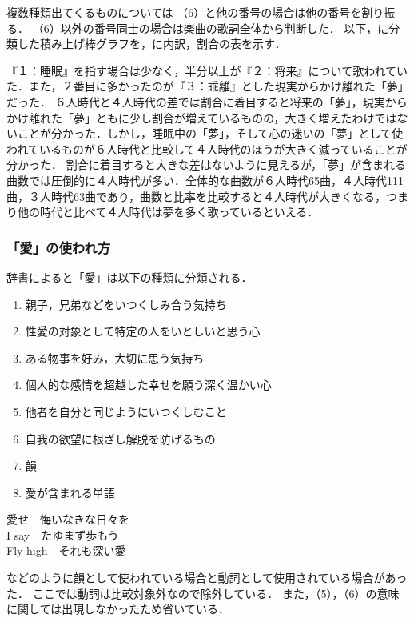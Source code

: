 複数種類出てくるものについては
（6）と他の番号の場合は他の番号を割り振る．
（6）以外の番号同士の場合は楽曲の歌詞全体から判断した．
%
以下，に分類した積み上げ棒グラフを，\protect{}に内訳，割合の表を示す．



『１：睡眠』を指す場合は少なく，半分以上が『２：将来』について歌われていた．また，２番目に多かったのが『３：乖離』とした現実からかけ離れた「夢」だった．
６人時代と４人時代の差では割合に着目すると将来の「夢」，現実からかけ離れた「夢」ともに少し割合が増えているものの，大きく増えたわけではないことが分かった．しかし，睡眠中の「夢」，そして心の迷いの「夢」として使われているものが６人時代と比較して４人時代のほうが大きく減っていることが分かった．
割合に着目すると大きな差はないように見えるが，「夢」が含まれる曲数では圧倒的に４人時代が多い．全体的な曲数が６人時代65曲，４人時代111曲，３人時代63曲であり，曲数と比率を比較すると４人時代が大きくなる，つまり他の時代と比べて４人時代は夢を多く歌っているといえる．



\subsubsection{「愛」の使われ方}
辞書によると「愛」は以下の種類に分類される\cite{AI}．
\begin{enumerate}
	\item 親子，兄弟などをいつくしみ合う気持ち
	\item 性愛の対象として特定の人をいとしいと思う心
	\item ある物事を好み，大切に思う気持ち
	\item 個人的な感情を超越した幸せを願う深く温かい心
	\item 他者を自分と同じようにいつくしむこと
	\item 自我の欲望に根ざし解脱を防げるもの
	\item 韻
	\item 愛が含まれる単語
\end{enumerate}

\begin{musequote}
	愛せ　悔いなきな日々を\\
	I say　たゆまず歩もう\\
	Fly high　それも深い愛
\end{musequote}
などのように韻として使われている場合と動詞として使用されている場合があった．
ここでは動詞は比較対象外なので除外している．
また，（5），（6）の意味に関しては出現しなかったため省いている．

